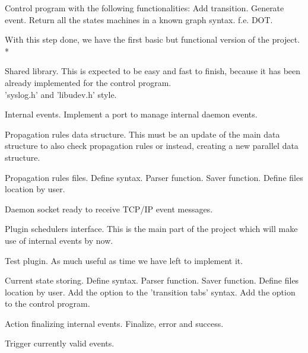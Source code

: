 \documentclass[a4paper,11pt]{scrartcl}
\begin{document}
\begin{list}{-}{March 9th, 2012}
  \item Control program with the following functionalities:
    \subitem Add transition.
    \subitem Generate event. %
    \subitem Return all the states machines in a known graph syntax.
      \subsubitem f.e. DOT.
\end{list}
With this step done, we have the first basic but functional version of the 
project.\\*
\\
\begin{list}{-}{March 16th, 2012}
  \item Shared library.
    \subitem This is expected to be easy and fast to finish, because it has 
	      been already implemented for the control program.\\
	      'syslog.h' and 'libudev.h' style.
  \item Internal events. %
    \subitem Implement a port to manage internal daemon events.
\end{list}
\begin{list}{-}{March 30th, 2012}
  \item Propagation rules data structure.
    \subitem This must be an update of the main data structure to also check
	      propagation rules or instead, creating a new parallel data 
	      structure.
  \item Propagation rules files.
    \subitem Define syntax.
    \subitem Parser function.
    \subitem Saver function.
    \subitem Define files location by user.
\end{list}
\begin{list}{-}{April 13th, 2012}
  \item Daemon socket ready to receive TCP/IP event messages.
  \item Plugin schedulers interface.
    \subitem This is the main part of the project which will make use of 
	      internal events by now.
\end{list}
\begin{list}{-}{April 27th, 2012}
  \item Test plugin.
    \subitem As much useful as time we have left to implement it.
  \item Current state storing.
    \subitem Define syntax.
    \subitem Parser function.
    \subitem Saver function.
    \subitem Define files location by user.
    \subitem Add the option to the 'transition tabs' syntax.
    \subitem Add the option to the control program.
  \item Action finalizing internal events.
    \subitem Finalize, error and success.
  \item Trigger currently valid events.
\end{list}
\end{document}
